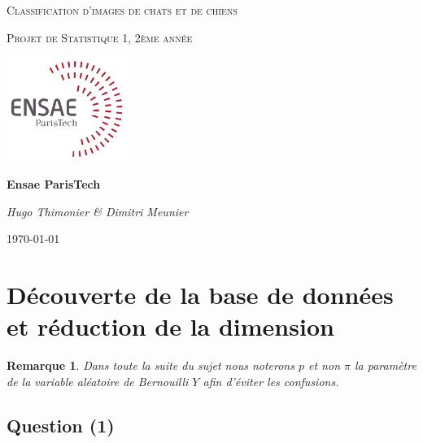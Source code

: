 \documentclass[10pt,a4paper]{report}\usepackage[]{graphicx}\usepackage[]{color}
\newtheorem*{rmq}{Remarque}
\begin{document}
\begin{titlepage}
	\centering
	{\scshape\LARGE Classification d’images de chats et de chiens \par}
	\vspace{0.5cm}
	{\scshape Projet de Statistique 1, 2ème année\par}
	\vspace{1.5cm}
	\includegraphics[width=0.3\textwidth]{../Images/ensae.png}\par
	\vspace{1cm}
	{\huge\bfseries Ensae ParisTech \par}
	\vspace{2cm}
	{\Large\itshape Hugo Thimonier \& Dimitri Meunier \par}
	\vfill
	{\large \today\par}
	\pagecolor{white}    
\end{titlepage}

\pagecolor{white}
\tableofcontents
\newpage

\section{Découverte de la base de données et réduction de la dimension}

\begin{rmq}
\color{red}
Dans toute la suite du sujet nous noterons $p$ et non $\pi$ la paramètre de la variable aléatoire de Bernouilli $Y$ afin d'éviter les confusions.
\end{rmq}

\subsection{Question (1)}
\end{document}
